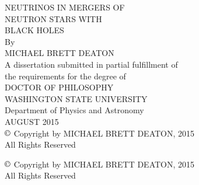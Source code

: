 \documentclass[12pt]{report}
\begin{document}

\begin{titlepage}
  \begin{singlespace}
    \begin{center}
      {\uppercase{
          Neutrinos in Mergers of\\
          \bigskip
          Neutron Stars with\\
          \bigskip
          Black Holes}}\\
      \vspace{1.31in}
      By\\
      \bigskip
      \uppercase{Michael Brett Deaton}\\
      \vspace{2.65in}
      A dissertation submitted in partial fulfillment of\\
      the requirements for the degree of\\
      \bigskip
      \uppercase{Doctor of Philosophy}\\
      \bigskip \bigskip \bigskip
      \uppercase{Washington State University}\\
      Department of Physics and Astronomy\\
      \bigskip
      \uppercase{August 2015}\\
      \bigskip \bigskip
      $\copyright$ Copyright by MICHAEL BRETT DEATON, 2015\\
      All Rights Reserved
    \end{center}
  \end{singlespace}
\end{titlepage}
\newpage

\thispagestyle{empty} %
\begin{center}
  \begin{singlespace}
    \null %
    \vfill
    $\copyright$ Copyright by \uppercase{Michael Brett Deaton}, 2015\\
    All Rights Reserved
  \end{singlespace}
\end{center}
\newpage
\end{document}
